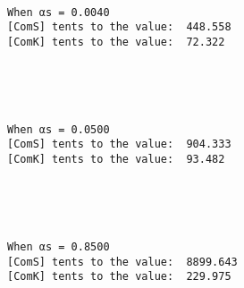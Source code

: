 \documentclass[11pt]{article}
\begin{document}
    \begin{center}
    \end{center}
    { \hspace*{\fill} \\}
    
    \begin{Verbatim}[commandchars=\\\{\}]
When αs = 0.0040
[ComS] tents to the value:  448.558
[ComK] tents to the value:  72.322

    \end{Verbatim}

    \begin{center}
    \end{center}
    { \hspace*{\fill} \\}
    
    \begin{center}
    \end{center}
    { \hspace*{\fill} \\}
    
    \begin{Verbatim}[commandchars=\\\{\}]
When αs = 0.0500
[ComS] tents to the value:  904.333
[ComK] tents to the value:  93.482

    \end{Verbatim}

    \begin{center}
    \end{center}
    { \hspace*{\fill} \\}
    
    \begin{center}
    \end{center}
    { \hspace*{\fill} \\}
    
    \begin{Verbatim}[commandchars=\\\{\}]
When αs = 0.8500
[ComS] tents to the value:  8899.643
[ComK] tents to the value:  229.975

    \end{Verbatim}
\end{document}
